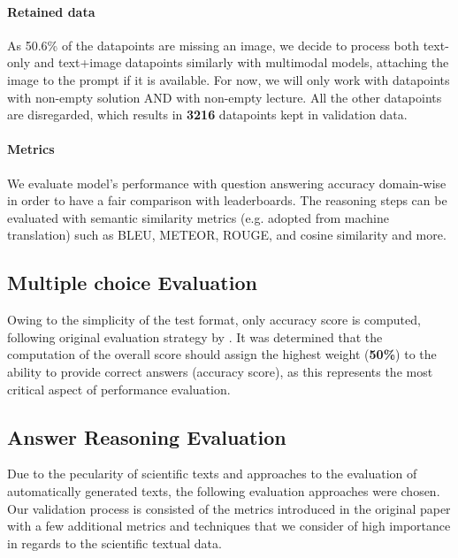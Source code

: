 \documentclass{article}
\begin{document}
\paragraph{Retained data} As 50.6\% of the datapoints are missing an image, we decide to process both text-only and text+image datapoints similarly with multimodal models, attaching the image to the prompt if it is available.
For now, we will only work with datapoints with non-empty solution AND with non-empty lecture. All the other datapoints are disregarded,
which results in \textbf{3216} datapoints kept in validation data.  


\paragraph{Metrics}
We evaluate model's performance with question answering accuracy domain-wise in order to have a fair comparison with leaderboards. The reasoning steps can be evaluated with semantic similarity metrics (e.g. adopted from machine translation) such as BLEU, METEOR, ROUGE, and cosine similarity and more.
\subsection{Multiple choice Evaluation}
Owing to the simplicity of the test format, only accuracy score is computed, following original evaluation strategy by \cite{lu2022learn}. It was determined that the computation of the overall score should assign the highest weight (\textbf{50\%}) to the ability to provide correct answers (accuracy score), as this represents the most critical aspect of performance evaluation.
\subsection{Answer Reasoning Evaluation}
Due to the pecularity of scientific texts and approaches to the evaluation of automatically generated texts, the following evaluation approaches were chosen. Our validation process is consisted of the metrics introduced in the original paper \cite{lu2022learn}  with a few additional metrics and techniques that we consider of high importance in regards to the scientific textual data.
\end{document}
